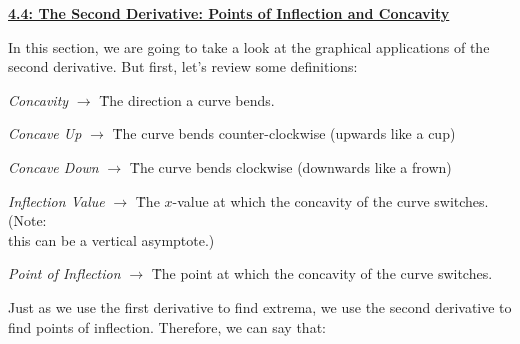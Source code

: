 \textbf{\underline{\large{4.4: The Second Derivative: Points of Inflection and Concavity}}} \par

In this section, we are going to take a look at the graphical applications of the second derivative. But first, let's review some definitions: \par

\begin{tcolorbox}[definition]
    \begin{tabbing}
        \textit{Concavity} $\rightarrow$ \= The direction a curve bends. 
    \end{tabbing} \vspace{11pt}
    \begin{tabbing}
        \textit{Concave Up} $\rightarrow$ \= The curve bends counter-clockwise (upwards like a cup) 
    \end{tabbing} \vspace{11pt}
    \begin{tabbing}
        \textit{Concave Down} $\rightarrow$ \= The curve bends clockwise (downwards like a frown)
    \end{tabbing} \vspace{11pt}
    \begin{tabbing}
        \textit{Inflection Value} $\rightarrow$ \= The $x$-value at which the concavity of the curve switches. (Note: \\
        \> this can be a vertical asymptote.)
    \end{tabbing} \vspace{11pt}
    \begin{tabbing}
        \textit{Point of Inflection} $\rightarrow$ \= The point at which the concavity of the curve switches.
    \end{tabbing} 
\end{tcolorbox}

Just as we use the first derivative to find extrema, we use the second derivative to find points of inflection. Therefore, we can say that: \par

\begin{center}
\end{center}

